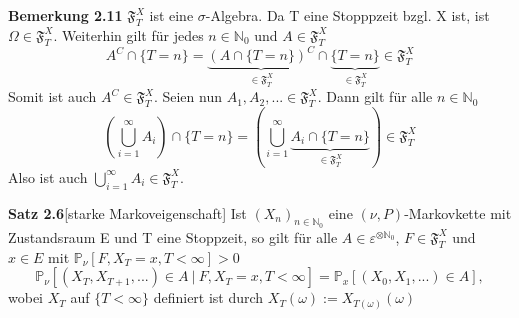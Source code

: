 \textbf{Bemerkung 2.11}
$\mathfrak{F}_{T}^{X}$ ist eine $\sigma$-Algebra. Da T eine Stopppzeit bzgl. X ist, ist $\Omega \in \mathfrak{F}_{T}^{X}$. Weiterhin gilt für jedes $n \in \mathbb{N}_{0}$ und $A \in \mathfrak{F}_{T}^{X}$
\begin{equation*}
A^{C} \cap \lbrace T = n \rbrace = \underbrace{(A \cap \lbrace T = n \rbrace)^{C}}_{ \in \mathfrak{F}_{T}^{X}} \cap \underbrace{\lbrace T = n \rbrace}_{ \in \mathfrak{F}_{T}^{X}} \in \mathfrak{F}_{T}^{X}
\end{equation*}
Somit ist auch $A^{C} \in \mathfrak{F}_{T}^{X}$. Seien nun $A_{1},A_{2},... \in \mathfrak{F}_{T}^{X}$. Dann gilt für alle $n \in \mathbb{N}_{0}$
\begin{equation*}
(\bigcup_{i=1}^{\infty} A_{i}) \cap \lbrace T = n \rbrace = (\bigcup_{i=1}^{\infty} \underbrace { A_{i} \cap \lbrace T = n \rbrace}_{ \in \mathfrak{F}_{T}^{X}}) \in \mathfrak{F}_{T}^{X}
\end{equation*}
Also ist auch $\bigcup_{i=1}^{\infty} A_{i} \in \mathfrak{F}_{T}^{X}$.

\textbf{Satz 2.6}[starke Markoveigenschaft] 
\label{starke Markoveigenschaft}
Ist $(X_{n})_{n \in \mathbb{N}_{0}}$ eine $(\nu,P)$-Markovkette mit Zustandsraum E und T eine Stoppzeit, so gilt für alle $A \in \varepsilon^{ \otimes \mathbb{N}_{0}}$, $F \in \mathfrak{F}_{T}^{X}$ und $x \in E$ mit $\mathbb{P}_{\nu}[F,X_{T} = x, T < \infty] > 0$
\begin{equation*}
\mathbb{P}_{\nu}[(X_{T},X_{T+1},...) \in A \: | \: F, X_{T} = x, T < \infty] = \mathbb{P}_{x}[(X_{0},X_{1},...) \in A],
\end{equation*}
wobei $X_{T}$ auf $\lbrace T < \infty \rbrace$ definiert ist durch $X_{T}(\omega) := X_{T(\omega)}(\omega)$

